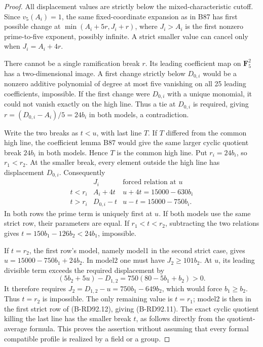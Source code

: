 \begin{proof}
All displacement values are strictly below the mixed-characteristic
cutoff. Since \(v_5(A_i)=1\), the same fixed-coordinate expansion
as in B87 has first possible change at
\(\min(A_i+5r,J_i+r)\), where \(J_i>A_i\) is the first nonzero
prime-to-five exponent, possibly infinite. A strict smaller value
can cancel only when \(J_i=A_i+4r\).

There cannot be a single ramification break \(r\). Its leading
coefficient map on \(\mathbf F_5^2\) has a two-dimensional image.
A first change strictly below \(D_{0,i}\) would be a nonzero
additive polynomial of degree at most five vanishing on all 25
leading coefficients, impossible. If the first change were
\(D_{0,i}\) with a unique monomial, it could not vanish exactly
on the high line. Thus a tie at \(D_{0,i}\) is required, giving
\(r=(D_{0,i}-A_i)/5=24b_i\) in both models, a contradiction.

Write the two breaks as \(t<u\), with last line \(T\). If
\(T\) differed from the common high line, the coefficient lemma
B87 would give the same larger cyclic quotient break \(24b_i\)
in both models. Hence \(T\) is the common high line. Put
\(r_i=24b_i\), so \(r_1<r_2\). At the smaller break, every
element outside the high line has displacement \(D_{0,i}\).
Consequently
\[
 \begin{array}{c|c|c}
 &J_i&\text{forced relation at }u\\\hline
 t<r_i&A_i+4t&u+4t=15000-630b_i\\
 t>r_i&D_{0,i}-t&u-t=15000-750b_i.
 \end{array}                                           \tag{B-RD92.12}
\]
In both rows the prime term is uniquely first at \(u\). If both
models use the same strict row, their parameters are equal. If
\(r_1<t<r_2\), subtracting the two relations gives
\(t=150b_1-126b_2<24b_1\), impossible.

If \(t=r_2\), the first row's model, namely model1 in the second
strict case, gives \(u=15000-750b_1+24b_2\). In model2 one must
have \(J_2\ge101b_2\). At \(u\), its leading divisible term
exceeds the required displacement by
\[
 (5b_2+5u)-D_{1,2}=750(80-5b_1+b_2)>0.
\]
It therefore requires \(J_2=D_{1,2}-u=750b_1-649b_2\), which
would force \(b_1\ge b_2\). Thus \(t=r_2\) is impossible.
The only remaining value is \(t=r_1\); model2 is then in the
first strict row of (B-RD92.12), giving (B-RD92.11). The exact
cyclic quotient killing the last line has the smaller break \(t\),
as follows directly from the quotient-average formula. This proves
the assertion without assuming that every formal compatible profile
is realized by a field or a group.
\end{proof}

